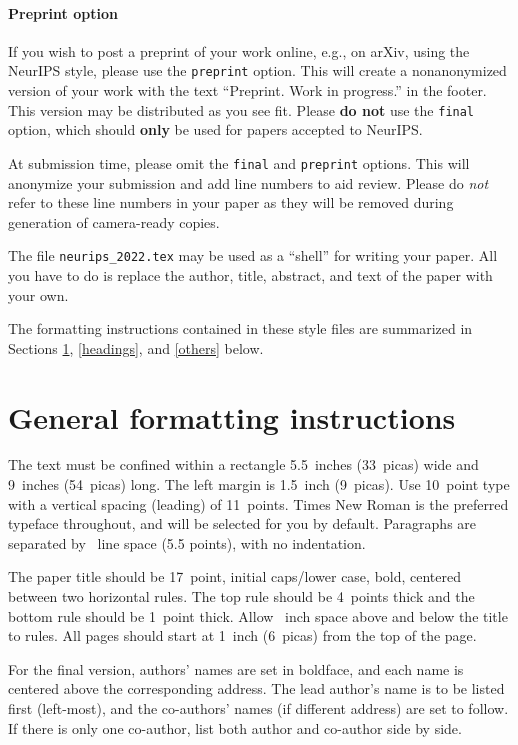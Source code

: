 \documentclass{article}
\begin{document}
\paragraph{Preprint option}
If you wish to post a preprint of your work online, e.g., on arXiv, using the
NeurIPS style, please use the \verb+preprint+ option. This will create a
nonanonymized version of your work with the text ``Preprint. Work in progress.''
in the footer. This version may be distributed as you see fit. Please \textbf{do
  not} use the \verb+final+ option, which should \textbf{only} be used for
papers accepted to NeurIPS.


At submission time, please omit the \verb+final+ and \verb+preprint+
options. This will anonymize your submission and add line numbers to aid
review. Please do \emph{not} refer to these line numbers in your paper as they
will be removed during generation of camera-ready copies.


The file \verb+neurips_2022.tex+ may be used as a ``shell'' for writing your
paper. All you have to do is replace the author, title, abstract, and text of
the paper with your own.


The formatting instructions contained in these style files are summarized in
Sections \ref{gen_inst}, \ref{headings}, and \ref{others} below.


\section{General formatting instructions}
\label{gen_inst}


The text must be confined within a rectangle 5.5~inches (33~picas) wide and
9~inches (54~picas) long. The left margin is 1.5~inch (9~picas).  Use 10~point
type with a vertical spacing (leading) of 11~points.  Times New Roman is the
preferred typeface throughout, and will be selected for you by default.
Paragraphs are separated by ~line space (5.5 points), with no
indentation.


The paper title should be 17~point, initial caps/lower case, bold, centered
between two horizontal rules. The top rule should be 4~points thick and the
bottom rule should be 1~point thick. Allow ~inch space above and
below the title to rules. All pages should start at 1~inch (6~picas) from the
top of the page.


For the final version, authors' names are set in boldface, and each name is
centered above the corresponding address. The lead author's name is to be listed
first (left-most), and the co-authors' names (if different address) are set to
follow. If there is only one co-author, list both author and co-author side by
side.
\end{document}
